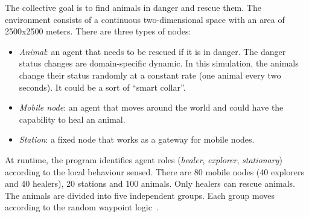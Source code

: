 The collective goal is to find animals in danger and rescue them.
%
The environment consists of a continuous two-dimensional space 
 with an area of 2500x2500 meters. 
%
There are three types of nodes:
\begin{itemize}
\item \emph{Animal}: an agent that needs to be rescued if it is in danger. 
 The danger status changes are domain-specific dynamic. 
 In this simulation, the animals change their 
 status randomly at a constant rate (one animal every two seconds).
 It could be a sort of ``smart collar''.
\item \emph{Mobile node}: an agent that moves around the world 
 and could have the capability to heal an animal.
\item \emph{Station}: a fixed node that works as a gateway for mobile nodes.
\end{itemize}
%
%
At runtime, the program identifies agent roles (\emph{healer}, \emph{explorer}, \emph{stationary})
 according to the local behaviour sensed.
%
There are 80 mobile nodes (40 explorers and 40 healers), 20 stations and 100 animals. 
 Only healers can rescue animals.
%
The animals are divided into five independent groups.
 Each group moves according to the random waypoint logic~\cite{MAO2010201}.
